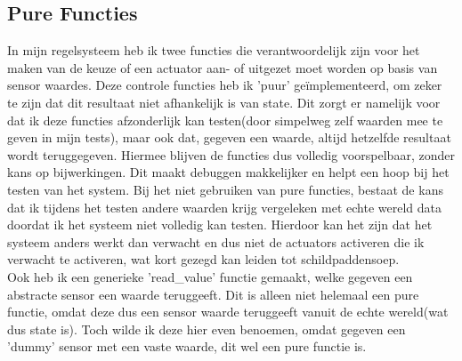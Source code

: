 \documentclass[a4paper]{report}
\begin{document}
\subsection{Pure Functies}
In mijn regelsysteem heb ik twee functies die verantwoordelijk zijn voor het maken van de keuze of een actuator aan- of uitgezet moet worden op basis van sensor waardes.
Deze controle functies heb ik 'puur' geïmplementeerd, om zeker te zijn dat dit resultaat niet afhankelijk is van state. 
Dit zorgt er namelijk voor dat ik deze functies afzonderlijk kan testen(door simpelweg zelf waarden mee te geven in mijn tests), maar ook dat, gegeven een waarde, altijd hetzelfde resultaat wordt teruggegeven.
Hiermee blijven de functies dus volledig voorspelbaar, zonder kans op bijwerkingen. Dit maakt debuggen makkelijker en helpt een hoop bij het testen van het system.
Bij het niet gebruiken van pure functies, bestaat de kans dat ik tijdens het testen andere waarden krijg vergeleken met echte wereld data doordat ik het systeem niet volledig kan testen. 
Hierdoor kan het zijn dat het systeem anders werkt dan verwacht en dus niet de actuators activeren die ik verwacht te activeren, wat kort gezegd kan leiden tot schildpaddensoep.
\\
Ook heb ik een generieke 'read\_value' functie gemaakt, welke gegeven een abstracte sensor een waarde teruggeeft.
Dit is alleen niet helemaal een pure functie, omdat deze dus een sensor waarde teruggeeft vanuit de echte wereld(wat dus state is).
Toch wilde ik deze hier even benoemen, omdat gegeven een 'dummy' sensor met een vaste waarde, dit wel een pure functie is.
\end{document}
